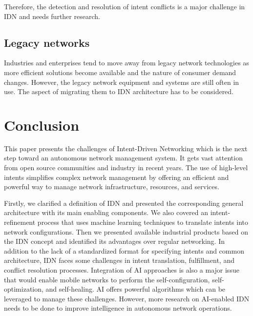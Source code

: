 Therefore, the detection and resolution of intent conflicts is a major challenge in IDN and needs further research.


\subsection{Legacy networks}
Industries and enterprises tend to move away from legacy network technologies as more efficient solutions become available and the nature of consumer demand changes. However, the legacy network equipment and systems are still often in use. The aspect of migrating them to IDN architecture has to be considered. \cite{Saha2018}


\section{Conclusion}
\label{sec:Conclusion}

This paper presents the challenges of Intent-Driven Networking which is the next step toward an autonomous network management system. It gets vast attention from open source communities and industry in recent years. The use of high-level intents simplifies complex network management by offering an efficient and powerful way to manage network infrastructure, resources, and services.

Firstly, we clarified a definition of IDN and presented the corresponding general architecture with its main enabling components. We also covered an intent-refinement process that uses machine learning techniques to translate intents into network configurations. Then we presented available industrial products based on the IDN concept and identified its advantages over regular networking. In addition to the lack of a standardized format for specifying intents and common architecture, IDN faces some challenges in intent translation, fulfillment, and conflict resolution processes. Integration of AI approaches is also a major issue that would enable mobile networks to perform the self-configuration, self-optimization, and self-healing. AI offers powerful algorithms which can be leveraged to manage these challenges. However, more research on AI-enabled IDN needs to be done to improve intelligence in autonomous network operations.

\printbibliography[heading=bibintoc]





